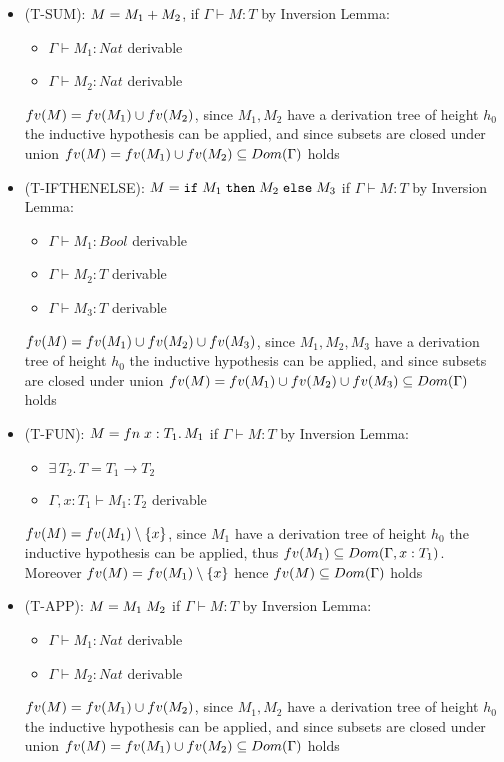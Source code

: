 \begin{itemize}
	\item (T-SUM): $M = M_1+M_2$,
	      if $\Gamma \vdash M: T$
	      by Inversion Lemma:
	      \begin{itemize}
		      \item $\Gamma \vdash M_1 : Nat$ derivable
		      \item $\Gamma \vdash M_2 : Nat$ derivable
	      \end{itemize}
	      $fv(M)=fv(M_1)\cup fv(M_2)$, since $M_1, M_2$ have a derivation tree of height $h_0$
	      the inductive hypothesis can be applied, and since subsets are closed under union
	      $fv(M)=fv(M_1)\cup fv(M_2) \subseteq Dom(\Gamma)$ holds
	\item (T-IFTHENELSE): $M = \texttt{if}\;M_1\;\texttt{then}\;M_2\;\texttt{else}\;M_3$
	      if $\Gamma \vdash M: T$
	      by Inversion Lemma:
	      \begin{itemize}
		      \item $\Gamma \vdash M_1 : Bool$ derivable
		      \item $\Gamma \vdash M_2 : T$ derivable
		      \item $\Gamma \vdash M_3 : T$ derivable
	      \end{itemize}
	      $fv(M)=fv(M_1)\cup fv(M_2)\cup fv(M_3)$, since $M_1, M_2, M_3$ have a derivation tree of height $h_0$
	      the inductive hypothesis can be applied, and since subsets are closed under union
	      $fv(M)=fv(M_1)\cup fv(M_2)\cup fv(M_3) \subseteq Dom(\Gamma)$ holds
	\item (T-FUN): $M = fn\;x: T_1.\,M_1$
	      if $\Gamma \vdash M: T$
	      by Inversion Lemma:
	      \begin{itemize}
		      \item $\exists\, T_2.\, T = T_1 \to T_2$
		      \item $\Gamma, x: T_1 \vdash M_1 : T_2$ derivable
	      \end{itemize}
	      $fv(M)=fv(M_1)\setminus \{x\}$, since $M_1$ have a derivation tree of height $h_0$
	      the inductive hypothesis can be applied, thus $fv(M_1)\subseteq Dom(\Gamma,x:T_1)$.
	      Moreover $fv(M)=fv(M_1)\setminus\{x\}$ hence $fv(M)\subseteq Dom(\Gamma)$ holds
	\item (T-APP): $M = M_1\;M_2$
	      if $\Gamma \vdash M: T$
	      by Inversion Lemma:
	      \begin{itemize}
		      \item $\Gamma \vdash M_1 : Nat$ derivable
		      \item $\Gamma \vdash M_2 : Nat$ derivable
	      \end{itemize}
	      $fv(M)=fv(M_1)\cup fv(M_2)$, since $M_1, M_2$ have a derivation tree of height $h_0$
	      the inductive hypothesis can be applied, and since subsets are closed under union
	      $fv(M)=fv(M_1)\cup fv(M_2) \subseteq Dom(\Gamma)$ holds
\end{itemize}


